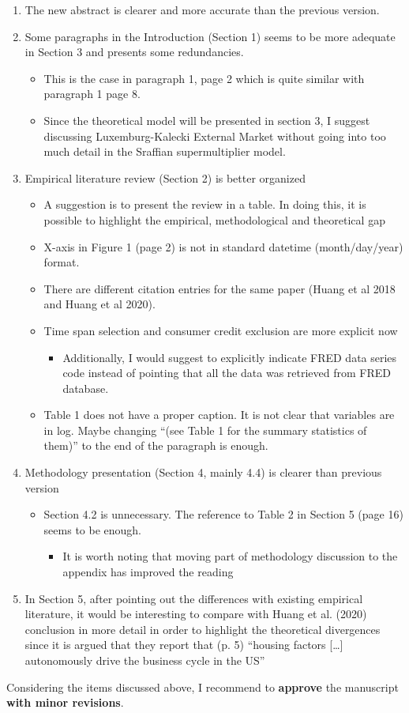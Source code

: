 \documentclass[11pt]{article}
\begin{document}
\begin{enumerate}
\item The new abstract is clearer and more accurate than the previous version.
\item Some paragraphs in the Introduction (Section 1) seems to be more adequate in Section 3 and presents some redundancies.
\begin{itemize}
\item This is the case in paragraph 1, page 2 which is quite similar with paragraph 1 page 8.
\item Since the theoretical model will be presented in section 3, I suggest discussing Luxemburg-Kalecki External Market without going into too much detail in the Sraffian supermultiplier model.
\end{itemize}
\item Empirical literature review (Section 2) is better organized
\begin{itemize}
\item A suggestion is to present the review in a table. In doing this, it is possible to highlight the empirical, methodological and theoretical gap
\item X-axis in Figure 1 (page 2) is not in standard datetime (month/day/year) format.
\item There are different citation entries for the same paper (Huang et al 2018 and Huang et al 2020).
\item Time span selection and consumer credit exclusion are more explicit now
\begin{itemize}
\item Additionally, I would suggest to explicitly indicate FRED data series code instead of pointing that all the data was retrieved from FRED database.
\end{itemize}
\item Table 1 does not have a proper caption. It is not clear that variables are in log. Maybe changing ``(see Table 1 for the summary statistics of them)'' to the end of the paragraph is enough.
\end{itemize}
\item Methodology presentation (Section 4, mainly 4.4) is clearer than previous version
\begin{itemize}
\item Section 4.2 is unnecessary. The reference to Table 2 in Section 5 (page 16) seems to be enough.
\begin{itemize}
\item It is worth noting that moving part of methodology discussion to the appendix has improved the reading
\end{itemize}
\end{itemize}
\item In Section 5, after pointing out the differences with existing empirical literature, it would be interesting to compare with Huang et al. (2020) conclusion in more detail in order to highlight the theoretical divergences since it is argued that they report that (p. 5) ``housing factors [\ldots{}]   autonomously drive the business cycle in the US''
\end{enumerate}

\noindent Considering the items discussed above, I recommend to \textbf{approve} the manuscript \textbf{with minor revisions}.
\end{document}
